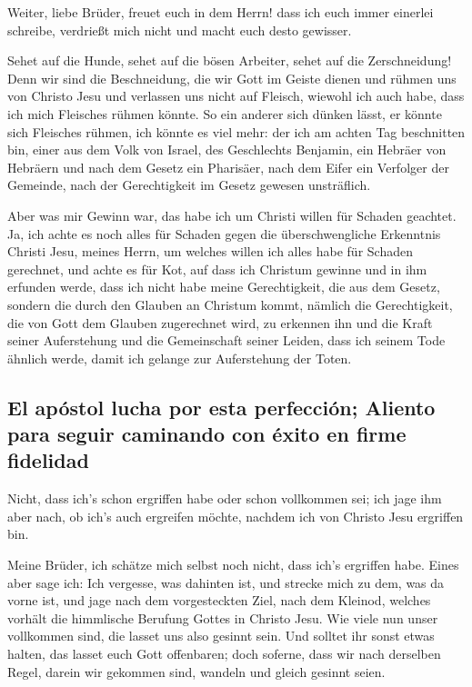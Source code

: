  Weiter, liebe Brüder, freuet euch in dem Herrn! dass ich
euch immer einerlei schreibe, verdrießt mich nicht und macht euch desto
gewisser.

 Sehet auf die Hunde, sehet auf die bösen Arbeiter, sehet
auf die Zerschneidung!  Denn wir sind die Beschneidung,
die wir Gott im Geiste dienen und rühmen uns von Christo Jesu und
verlassen uns nicht auf Fleisch,  wiewohl ich auch habe,
dass ich mich Fleisches rühmen könnte. So ein anderer sich dünken lässt,
er könnte sich Fleisches rühmen, ich könnte es viel mehr: 
der ich am achten Tag beschnitten bin, einer aus dem Volk von Israel,
des Geschlechts Benjamin, ein Hebräer von Hebräern und nach dem Gesetz
ein Pharisäer,  nach dem Eifer ein Verfolger der Gemeinde,
nach der Gerechtigkeit im Gesetz gewesen unsträflich.

 Aber was mir Gewinn war, das habe ich um Christi willen
für Schaden geachtet.  Ja, ich achte es noch alles für
Schaden gegen die überschwengliche Erkenntnis Christi Jesu, meines
Herrn, um welches willen ich alles habe für Schaden gerechnet, und achte
es für Kot, auf dass ich Christum gewinne  und in ihm
erfunden werde, dass ich nicht habe meine Gerechtigkeit, die aus dem
Gesetz, sondern die durch den Glauben an Christum kommt, nämlich die
Gerechtigkeit, die von Gott dem Glauben zugerechnet wird,
 zu erkennen ihn und die Kraft seiner Auferstehung und
die Gemeinschaft seiner Leiden, dass ich seinem Tode ähnlich werde,
 damit ich gelange zur Auferstehung der Toten.

\hypertarget{el-apuxf3stol-lucha-por-esta-perfecciuxf3n-aliento-para-seguir-caminando-con-uxe9xito-en-firme-fidelidad}{%
\subsection{El apóstol lucha por esta perfección; Aliento para seguir
caminando con éxito en firme
fidelidad}\label{el-apuxf3stol-lucha-por-esta-perfecciuxf3n-aliento-para-seguir-caminando-con-uxe9xito-en-firme-fidelidad}}

 Nicht, dass ich's schon ergriffen habe oder schon
vollkommen sei; ich jage ihm aber nach, ob ich's auch ergreifen möchte,
nachdem ich von Christo Jesu ergriffen bin.

 Meine Brüder, ich schätze mich selbst noch nicht, dass
ich's ergriffen habe. Eines aber sage ich: Ich vergesse, was dahinten
ist, und strecke mich zu dem, was da vorne ist,  und jage
nach dem vorgesteckten Ziel, nach dem Kleinod, welches vorhält die
himmlische Berufung Gottes in Christo Jesu.  Wie viele
nun unser vollkommen sind, die lasset uns also gesinnt sein. Und solltet
ihr sonst etwas halten, das lasset euch Gott offenbaren; 
doch soferne, dass wir nach derselben Regel, darein wir gekommen sind,
wandeln und gleich gesinnt seien.

